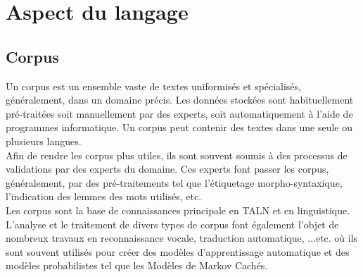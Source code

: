    
\section{Aspect du langage}
 
    \subsection{Corpus}
    Un corpus est un ensemble vaste de textes uniformisés et spécialisés, généralement, dans un domaine précis.
    Les données stockées sont habituellement pré-traitées soit manuellement par des experts, soit automatiquement à l'aide de programmes informatique. Un corpus peut contenir des textes dans une seule ou plusieurs langues.\\ 
    Afin de rendre les corpus plus utiles, ils sont souvent soumis à des processus de validations par des experts du domaine. Ces experts font passer les corpus, généralement, par des pré-traitements tel que l'étiquetage morpho-syntaxique, l'indication des lemmes des mots utilisés, etc.\\
    Les corpus sont la base de connaissances principale en TALN et en linguistique. L'analyse et le traitement de divers types de corpus font également l'objet de nombreux travaux en reconnaissance vocale, traduction automatique, ...etc. où ils sont souvent utilisés pour créer des modèles d'apprentissage automatique et des modèles probabilistes tel que les Modèles de Markov Cachés.\\


